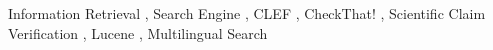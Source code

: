 \documentclass{ceurart}
\begin{document}
\begin{keywords}
  Information Retrieval \sep
  Search Engine \sep
  CLEF \sep
  CheckThat! \sep
  Scientific Claim Verification \sep
  Lucene \sep
  Multilingual Search
\end{keywords}

\maketitle












% 







\end{document}
